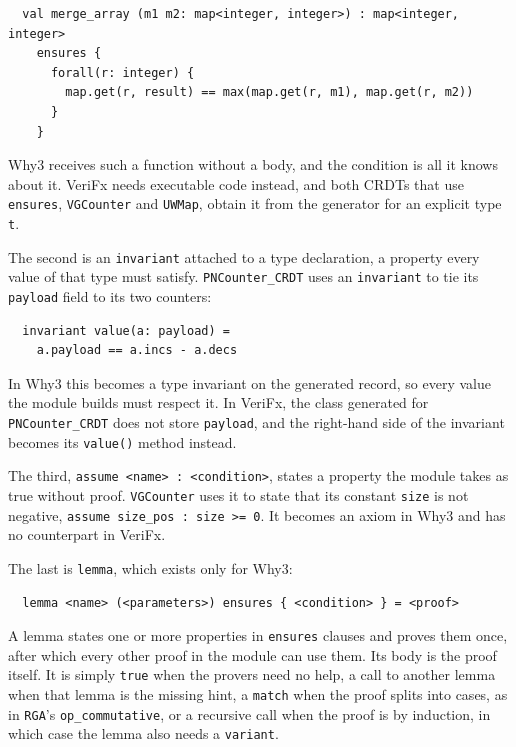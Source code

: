 \begin{verbatim}
  val merge_array (m1 m2: map<integer, integer>) : map<integer, integer>
    ensures {
      forall(r: integer) {
        map.get(r, result) == max(map.get(r, m1), map.get(r, m2))
      }
    }
\end{verbatim}

Why3 receives such a function without a body, and the condition is all it knows about it. VeriFx needs executable code
instead, and both CRDTs that use \texttt{ensures}, \texttt{VGCounter} and \texttt{UWMap}, obtain it from the generator for
an explicit type \texttt{t}.

The second is an \texttt{invariant} attached to a type declaration, a property every value of that type must satisfy.
\texttt{PNCounter\_CRDT} uses an \texttt{invariant} to tie its \texttt{payload} field to its two counters:

\begin{verbatim}
  invariant value(a: payload) =
    a.payload == a.incs - a.decs
\end{verbatim}

In Why3 this becomes a type invariant on the generated record, so every value the module builds must respect it. In VeriFx,
the class generated for \texttt{PNCounter\_CRDT} does not store \texttt{payload}, and the right-hand side of the invariant
becomes its \texttt{value()} method instead.

The third, \texttt{assume <name> : <condition>}, states a property the module takes as true without proof.
\texttt{VGCounter} uses it to state that its constant \texttt{size} is not negative, \texttt{assume size\_pos : size >= 0}.
It becomes an axiom in Why3 and has no counterpart in VeriFx.

The last is \texttt{lemma}, which exists only for Why3:

\begin{verbatim}
  lemma <name> (<parameters>) ensures { <condition> } = <proof>
\end{verbatim}

A lemma states one or more properties in \texttt{ensures} clauses and proves them once, after which every other proof in
the module can use them. Its body is the proof itself. It is simply \texttt{true} when the provers need no help, a call to
another lemma when that lemma is the missing hint, a \texttt{match} when the proof splits into cases, as in \texttt{RGA}'s
\texttt{op\_commutative}, or a recursive call when the proof is by induction, in which case the lemma also needs a
\texttt{variant}.

